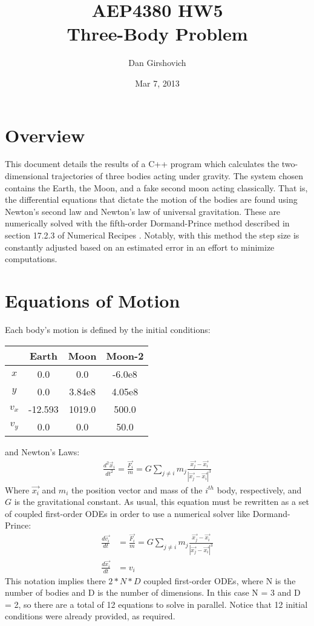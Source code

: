 \documentclass[12pt]{article}
\title{AEP4380 HW5 \\ Three-Body Problem}
\author{Dan Girshovich}
\date{Mar 7, 2013}
\begin{document}
\maketitle
\section{Overview}
This document details the results of a C++ program which calculates the two-dimensional trajectories of three bodies acting under gravity. The system chosen contains the Earth, the Moon, and a fake second moon acting classically. That is, the differential equations that dictate the motion of the bodies are found using Newton's second law and Newton's law of universal gravitation. These are numerically solved with the fifth-order Dormand-Prince method described in section 17.2.3 of Numerical Recipes \cite{numericalrecipes}. Notably, with this method the step size is constantly adjusted based on an estimated error in an effort to minimize computations.
\section{Equations of Motion}
Each body's motion is defined by the initial conditions:
\begin{center}
\begin{tabular}{ c | c c c }
& Earth & Moon & Moon-2 \\ \hline
$x$ & 0.0 & 0.0 & -6.0e8 \\
$y$ & 0.0 & 3.84e8 &  4.05e8 \\
$v_x$ & -12.593 & 1019.0 & 500.0 \\
$v_y$ & 0.0 & 0.0 & 50.0 \\
\end{tabular}
\end{center}
and Newton's Laws:
\begin{align*}
\frac{d^2\vec{x}_i}{dt^2} = \frac{\vec{F_i}}{m} = G \sum_{j \neq i} m_j \frac{\vec{x_j}-\vec{x_i}}{|\vec{x_j}-\vec{x_i}|^3}
\end{align*}
Where $\vec{x_i}$ and $m_i$ the position vector and mass of the $i^{th}$ body, respectively, and $G$ is the gravitational constant. As usual, this equation must be rewritten as a set of coupled first-order ODEs in order to use a numerical solver like Dormand-Prince:
\begin{align*}
\frac{d\vec{v_i}}{dt} &= \frac{\vec{F_i}}{m} = G \sum_{j \neq i} m_j \frac{\vec{x_j}-\vec{x_i}}{|\vec{x_j}-\vec{x_i}|^3} \\
\frac{d\vec{x_i}}{dt} &= v_i
\end{align*}
This notation implies there $2 * N * D$ coupled first-order ODEs, where N is the number of bodies and D is the number of dimensions. In this case N = 3 and D = 2, so there are a total of 12 equations to solve in parallel. Notice that 12 initial conditions were already provided, as required.
\end{document}
